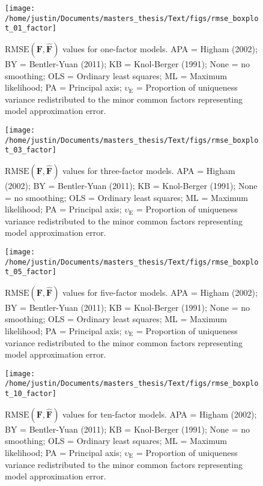 \documentclass[
  english,
  man]{apa6}
\begin{document}
\begin{appendix}
\begin{figure}
{\centering \texttt{[image: /home/justin/Documents/masters\_thesis/Text/figs/rmse\_boxplot\_01\_factor]} 

}

\caption{$\textrm{RMSE}(\mathbf{F}, \hat{\mathbf{F}})$ values for one-factor models. APA = Higham (2002); BY = Bentler-Yuan (2011); KB = Knol-Berger (1991); None = no smoothing; OLS = Ordinary least squares; ML = Maximum likelihood; PA = Principal axis; $\upsilon_{\textrm{E}}$ = Proportion of uniqueness variance redistributed to the minor common factors representing model approximation error.}\label{fig:rmse-one-factor}
\end{figure}

\begin{figure}

{\centering \texttt{[image: /home/justin/Documents/masters\_thesis/Text/figs/rmse\_boxplot\_03\_factor]} 

}

\caption{$\textrm{RMSE}(\mathbf{F}, \hat{\mathbf{F}})$ values for three-factor models. APA = Higham (2002); BY = Bentler-Yuan (2011); KB = Knol-Berger (1991); None = no smoothing; OLS = Ordinary least squares; ML = Maximum likelihood; PA = Principal axis; $\upsilon_{\textrm{E}}$ = Proportion of uniqueness variance redistributed to the minor common factors representing model approximation error.}\label{fig:rmse-three-factor}
\end{figure}

\begin{figure}

{\centering \texttt{[image: /home/justin/Documents/masters\_thesis/Text/figs/rmse\_boxplot\_05\_factor]} 

}

\caption{$\textrm{RMSE}(\mathbf{F}, \hat{\mathbf{F}})$ values for five-factor models. APA = Higham (2002); BY = Bentler-Yuan (2011); KB = Knol-Berger (1991); None = no smoothing; OLS = Ordinary least squares; ML = Maximum likelihood; PA = Principal axis; $\upsilon_{\textrm{E}}$ = Proportion of uniqueness variance redistributed to the minor common factors representing model approximation error.}\label{fig:rmse-five-factor}
\end{figure}

\begin{figure}

{\centering \texttt{[image: /home/justin/Documents/masters\_thesis/Text/figs/rmse\_boxplot\_10\_factor]} 

}

\caption{$\textrm{RMSE}(\mathbf{F}, \hat{\mathbf{F}})$ values for ten-factor models. APA = Higham (2002); BY = Bentler-Yuan (2011); KB = Knol-Berger (1991); None = no smoothing; OLS = Ordinary least squares; ML = Maximum likelihood; PA = Principal axis; $\upsilon_{\textrm{E}}$ = Proportion of uniqueness variance redistributed to the minor common factors representing model approximation error.}\label{fig:rmse-ten-factor}
\end{figure}
\end{appendix}
\end{document}
